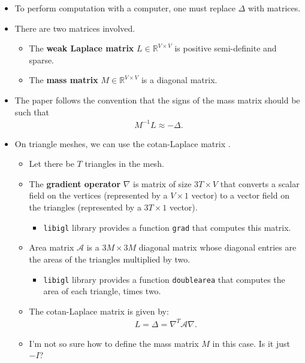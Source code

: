 \documentclass[10pt]{article}
\newcommand{\mcal}[1]{\mathcal{#1}}
\newcommand{\Real}{\mathbb{R}}
\begin{document}
\begin{itemize}
    \item To perform computation with a computer, one must replace $\Delta$ with matrices. 
    
    \item There are two matrices involved.
    \begin{itemize}
        \item The {\bf weak Laplace matrix} $L \in \Real^{V \times V}$ is positive semi-definite and sparse.
        \item The {\bf mass matrix} $M \in \Real^{V \times V}$ is a diagonal matrix.
    \end{itemize}

    \item The paper follows the convention that the signs of the mass matrix should be such that
    \begin{align*}
        M^{-1}L \approx -\Delta.
    \end{align*}

    \item On triangle meshes, we can use the cotan-Laplace matrix \cite{Crane:DdgCourse:2025}.
    \begin{itemize}
        \item Let there be $T$ triangles in the mesh.
        \item The {\bf gradient operator} $\nabla$ is matrix of size $3T \times V$ that converts a scalar field on the vertices (represented by a $V \times 1$ vector) to a vector field on the triangles (represented by a $3T \times 1$ vector).
        \begin{itemize}
            \item {\tt libigl} library provides a function {\tt grad} that computes this matrix.
        \end{itemize}        
        \item Area matrix $\mcal{A}$ is a $3M \times 3M$ diagonal matrix whose diagonal entries are the areas of the triangles multiplied by two.
        \begin{itemize}
            \item {\tt libigl} library provides a function {\tt doublearea} that computes the area of each triangle, times two.
        \end{itemize}
        \item The cotan-Laplace matrix is given by:
        \begin{align*}
            L = \Delta = \nabla^T \mcal{A} \nabla.
        \end{align*}
        \item I'm not so sure how to define the mass matrix $M$ in this case. Is it just $-I$?
    \end{itemize}


\end{itemize}
\end{document}
